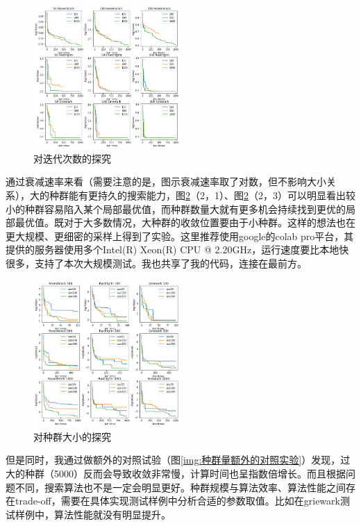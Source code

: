 \documentclass[lang=cn,11pt]{elegantpaper}
\begin{document}
\begin{figure}[h]
  \centering
  \includegraphics[width=0.5\textwidth]{figure/PSO/对迭代次数的探究.png} %
  \caption{对迭代次数的探究} %
  \label{img:对迭代次数的探究}
\end{figure}

通过衰减速率来看（需要注意的是，图示衰减速率取了对数，但不影响大小关系），大的种群能有更持久的搜索能力，图\ref{img:对种群大小的探究}（2，1）、图\ref{img:对种群大小的探究}（2，3）可以明显看出较小的种群容易陷入某个局部最优值，而种群数量大就有更多机会持续找到更优的局部最优值。既对于大多数情况，大种群的收敛位置要由于小种群。这样的想法也在更大规模、更细密的采样上得到了实验。这里推荐使用google的colab pro平台，其提供的服务器使用多个Intel(R) Xeon(R) CPU @ 2.20GHz，运行速度要比本地快很多，支持了本次大规模测试。我也共享了我的代码，连接在最前方。
\begin{figure}[h]
  \centering
  \includegraphics[width=0.5\textwidth]{figure/PSO/对种群大小的探究.png} %
  \caption{对种群大小的探究} %
  \label{img:对种群大小的探究}
\end{figure}


但是同时，我通过做额外的对照试验（图\ref{img:种群量额外的对照实验}）发现，过大的种群（5000）反而会导致收敛非常慢，计算时间也呈指数倍增长。而且根据问题不同，搜索算法也不是一定会明显更好。种群规模与算法效率、算法性能之间存在trade-off，需要在具体实现测试样例中分析合适的参数取值。比如在griewark测试样例中，算法性能就没有明显提升。
\end{document}
